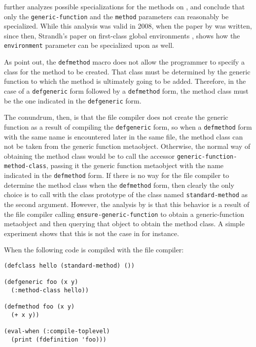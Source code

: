 \cnh{} further analyzes possible specializations for the methods on
\mml{}, and conclude that only the \texttt{generic-function} and the
\texttt{method} parameters can reasonably be specialized.  While this
analysis was valid in 2008, when the paper by \cnh{} was written,
since then, Strandh's paper on first-class global environments
\cite{Strandh:2015:ELS:Environments}, shows how the
\texttt{environment} parameter can be specialized upon as well.

As \cnh{} point out, the \texttt{defmethod} macro does
not allow the programmer to specify a class for the method to be
created.  That class must be determined by the generic function to
which the method is ultimately going to be added.  Therefore, in the
case of a \texttt{defgeneric} form followed by a \texttt{defmethod}
form, the method class must be the one indicated in the
\texttt{defgeneric} form.

The conundrum, then, is that the file compiler does not create the
generic function as a result of compiling the \texttt{defgeneric}
form, so when a \texttt{defmethod} form with the same name is
encountered later in the same file, the method class can not be taken
from the generic function metaobject.  Otherwise, the normal way of
obtaining the method class would be to call the accessor
\texttt{generic-function-method-class}, passing it the generic
function metaobject with the name indicated in the \texttt{defmethod}
form.  If there is no way for the file compiler to determine the
method class when the \texttt{defmethod} form, then clearly the only
choice is to call \mml{} with the class prototype of the class named
\texttt{standard-method} as the second argument.  However, the
analysis by \cnh{} is that this behavior is a result of the file
compiler calling \texttt{ensure-generic-function} to obtain a
generic-function metaobject and then querying that object to obtain
the method class.  A simple experiment shows that this is not the case
in \sbcl{} for instance.

When the following code is compiled with the \sbcl{} file compiler:

\begin{verbatim}
(defclass hello (standard-method) ())

(defgeneric foo (x y)
  (:method-class hello))

(defmethod foo (x y)
  (+ x y))

(eval-when (:compile-toplevel)
  (print (fdefinition 'foo)))
\end{verbatim}

